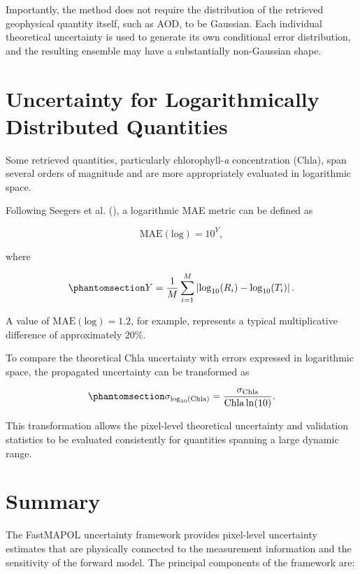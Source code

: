 \documentclass[
  11pt,
  letterpaper,
]{scrreprt}
\begin{document}
Importantly, the method does not require the distribution of the
retrieved geophysical quantity itself, such as AOD, to be Gaussian. Each
individual theoretical uncertainty is used to generate its own
conditional error distribution, and the resulting ensemble may have a
substantially non-Gaussian shape.

\section{Uncertainty for Logarithmically Distributed
Quantities}\label{uncertainty-for-logarithmically-distributed-quantities}

Some retrieved quantities, particularly chlorophyll-\emph{a}
concentration (Chla), span several orders of magnitude and are more
appropriately evaluated in logarithmic space.

Following Seegers et al. (), a
logarithmic MAE metric can be defined as

\[
\mathrm{MAE(log)}
=
10^Y,
\]

where

\begin{equation}\phantomsection\label{eq-uq-maelog}{
Y
=
\frac{1}{M}
\sum_{i=1}^{M}
\left|
\log_{10}(R_i)
-
\log_{10}(T_i)
\right|.
}\end{equation}

A value of \(\mathrm{MAE(log)}=1.2\), for example, represents a typical
multiplicative difference of approximately 20\%.

To compare the theoretical Chla uncertainty with errors expressed in
logarithmic space, the propagated uncertainty can be transformed as

\begin{equation}\phantomsection\label{eq-uq-chla-log}{
\sigma_{\log_{10}(\mathrm{Chla})}
=
\frac{
\sigma_{\mathrm{Chla}}
}{
\mathrm{Chla}\ln(10)
}.
}\end{equation}

This transformation allows the pixel-level theoretical uncertainty and
validation statistics to be evaluated consistently for quantities
spanning a large dynamic range.

\section{Summary}\label{summary-1}

The FastMAPOL uncertainty framework provides pixel-level uncertainty
estimates that are physically connected to the measurement information
and the sensitivity of the forward model. The principal components of
the framework are:
\end{document}
